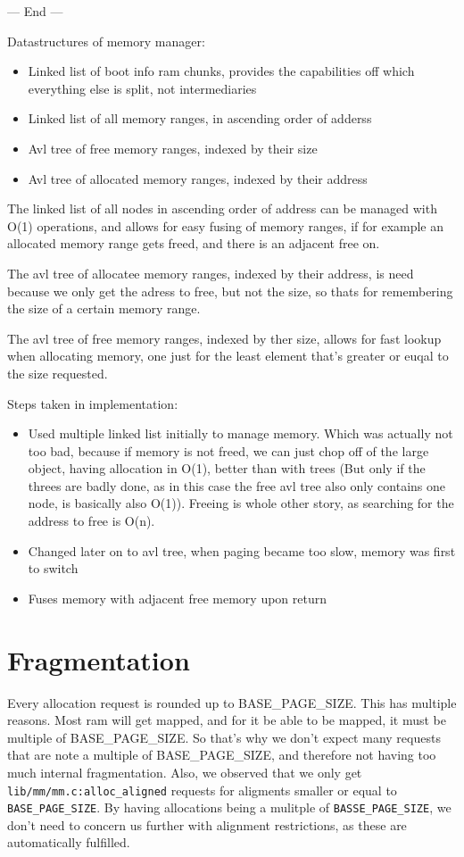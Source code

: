 --- End ---

Datastructures of memory manager:
\begin{itemize}
	\item Linked list of boot info ram chunks, provides the capabilities off which
				everything else is split, not intermediaries
	\item Linked list of all memory ranges, in ascending order of adderss
	\item Avl tree of free memory ranges, indexed by their size
	\item Avl tree of allocated memory ranges, indexed by their address
\end{itemize}

The linked list of all nodes in ascending order of address can be managed with
O(1) operations, and allows for easy fusing of memory ranges, if for example an
allocated memory range gets freed, and there is an adjacent free on.

The avl tree of allocatee memory ranges, indexed by their address, is need
because we only get the adress to free, but not the size, so thats for
remembering the size of a certain memory range.

The avl tree of free memory ranges, indexed by ther size, allows for fast
lookup when allocating memory, one just for the least element that's greater or
euqal to the size requested.

Steps taken in implementation:
\begin{itemize}
	\item Used multiple linked list initially to manage memory.
				Which was actually not too bad, because if memory is not freed, we can
				just chop off of the large object, having allocation in O(1), better than
				with trees (But only if the threes are badly done, as in this case the
				free avl tree also only contains one node, is basically also O(1)).
				Freeing is whole other story, as searching for the address to free is O(n).
	\item Changed later on to avl tree, when paging became too slow, memory was first to switch
	\item Fuses memory with adjacent free memory upon return
\end{itemize}

\section{Fragmentation}

Every allocation request is rounded up to BASE\_PAGE\_SIZE.
This has multiple reasons.
Most ram will get mapped, and for it be able to be mapped, it must be multiple
of BASE\_PAGE\_SIZE.
So that's why we don't expect many requests that are note a multiple of
BASE\_PAGE\_SIZE, and therefore not having too much internal fragmentation.
Also, we observed that we only get \verb|lib/mm/mm.c:alloc_aligned| requests for
aligments smaller or equal to \verb|BASE_PAGE_SIZE|.
By having allocations being a mulitple of \verb|BASSE_PAGE_SIZE|, we don't
need to concern us further with alignment restrictions, as these are
automatically fulfilled.


